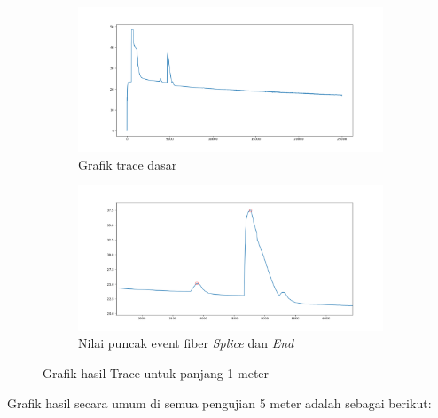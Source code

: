 \documentclass[12pt]{article}
\begin{document}
	\begin{figure}[h!]
		\centering
		\captionsetup{justification=centering}
		\begin{subfigure}[b]{0.7\textwidth}
			\includegraphics[width=\textwidth]{images/Bab_4/Bab_4_5d1}	
			\caption{\small{Grafik trace dasar}}		
		\end{subfigure}
		\begin{subfigure}[b]{0.7\textwidth}
			\includegraphics[width=\linewidth]{images/Bab_4/Bab_4_5d2}
			\caption{\small{Nilai puncak event fiber \textit{Splice} dan \textit{End}}}			
		\end{subfigure}
		\caption[Uji Pagar]{\small{Grafik hasil Trace untuk panjang 1 meter}}
	\end{figure}

	Grafik hasil secara umum di semua pengujian 5 meter adalah sebagai berikut:
	
\end{document}
